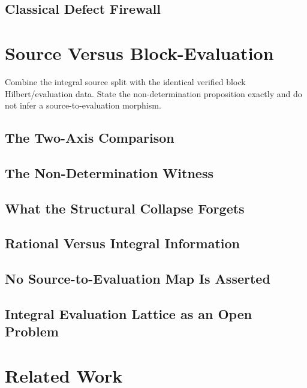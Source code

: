 \subsection{Classical Defect Firewall}

\section{Source Versus Block-Evaluation}\label{sec:source-block}


Combine the integral source split with the identical verified block
Hilbert/evaluation data.  State the non-determination proposition exactly and
do not infer a source-to-evaluation morphism.

\subsection{The Two-Axis Comparison}

\subsection{The Non-Determination Witness}

\subsection{What the Structural Collapse Forgets}

\subsection{Rational Versus Integral Information}

\subsection{No Source-to-Evaluation Map Is Asserted}

\subsection{Integral Evaluation Lattice as an Open Problem}

\section{Related Work}\label{sec:related-work}

